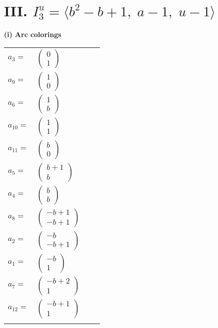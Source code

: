 \documentclass[1p]{elsarticle_modified}
\theoremstyle{definition}
\begin{document}
\centering \section*{III. $I^u_{3}= \langle b^2- b+1,\;a-1,\;u-1 \rangle$}
\flushleft \textbf{(i) Arc colorings}\\
\begin{tabular}{m{7pt} m{180pt} m{7pt} m{180pt} }
\flushright $a_{3}=$&$\begin{pmatrix}0\\1\end{pmatrix}$ \\
\flushright $a_{9}=$&$\begin{pmatrix}1\\0\end{pmatrix}$ \\
\flushright $a_{6}=$&$\begin{pmatrix}1\\b\end{pmatrix}$ \\
\flushright $a_{10}=$&$\begin{pmatrix}1\\1\end{pmatrix}$ \\
\flushright $a_{11}=$&$\begin{pmatrix}b\\0\end{pmatrix}$ \\
\flushright $a_{5}=$&$\begin{pmatrix}b+1\\b\end{pmatrix}$ \\
\flushright $a_{4}=$&$\begin{pmatrix}b\\b\end{pmatrix}$ \\
\flushright $a_{8}=$&$\begin{pmatrix}- b+1\\- b+1\end{pmatrix}$ \\
\flushright $a_{2}=$&$\begin{pmatrix}- b\\- b+1\end{pmatrix}$ \\
\flushright $a_{1}=$&$\begin{pmatrix}- b\\1\end{pmatrix}$ \\
\flushright $a_{7}=$&$\begin{pmatrix}- b+2\\1\end{pmatrix}$ \\
\flushright $a_{12}=$&$\begin{pmatrix}- b+1\\1\end{pmatrix}$\\&\end{tabular}
\end{document}
